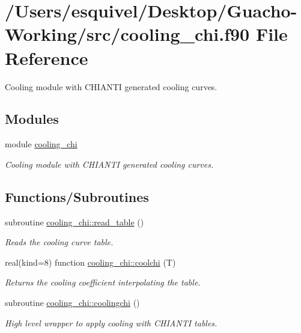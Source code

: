 \hypertarget{cooling__chi_8f90}{}\section{/\+Users/esquivel/\+Desktop/\+Guacho-\/\+Working/src/cooling\+\_\+chi.f90 File Reference}
\label{cooling__chi_8f90}


Cooling module with C\+H\+I\+A\+N\+T\+I generated cooling curves.  


\subsection*{Modules}
\begin{DoxyCompactItemize}
\item 
module \hyperlink{namespacecooling__chi}{cooling\+\_\+chi}
\begin{DoxyCompactList}\small\item\em Cooling module with C\+H\+I\+A\+N\+T\+I generated cooling curves. \end{DoxyCompactList}\end{DoxyCompactItemize}
\subsection*{Functions/\+Subroutines}
\begin{DoxyCompactItemize}
\item 
subroutine \hyperlink{namespacecooling__chi_acdcfaea636dd68b666577d8daf434d35}{cooling\+\_\+chi\+::read\+\_\+table} ()
\begin{DoxyCompactList}\small\item\em Reads the cooling curve table. \end{DoxyCompactList}\item 
real(kind=8) function \hyperlink{namespacecooling__chi_a20c87eb43e4f324fa7d83fe9174fd767}{cooling\+\_\+chi\+::coolchi} (T)
\begin{DoxyCompactList}\small\item\em Returns the cooling coefficient interpolating the table. \end{DoxyCompactList}\item 
subroutine \hyperlink{namespacecooling__chi_a666df501be07ce1e3612d3c3796cf2a3}{cooling\+\_\+chi\+::coolingchi} ()
\begin{DoxyCompactList}\small\item\em High level wrapper to apply cooling with C\+H\+I\+A\+N\+T\+I tables. \end{DoxyCompactList}\end{DoxyCompactItemize}
